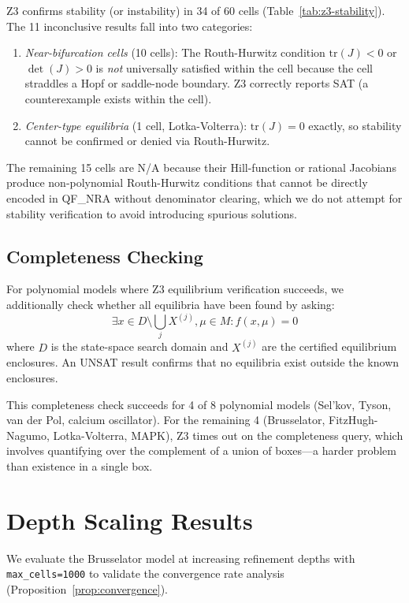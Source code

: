 \documentclass[11pt]{article}
\begin{document}
Z3 confirms stability (or instability) in 34 of 60 cells (Table~\ref{tab:z3-stability}).
The 11 inconclusive results fall into two categories:
\begin{enumerate}
\item \emph{Near-bifurcation cells} (10 cells): The Routh-Hurwitz condition $\mathrm{tr}(J) < 0$ or $\det(J) > 0$ is \emph{not} universally satisfied within the cell because the cell straddles a Hopf or saddle-node boundary.
Z3 correctly reports SAT (a counterexample exists within the cell).

\item \emph{Center-type equilibria} (1 cell, Lotka-Volterra): $\mathrm{tr}(J) = 0$ exactly, so stability cannot be confirmed or denied via Routh-Hurwitz.
\end{enumerate}

The remaining 15 cells are N/A because their Hill-function or rational Jacobians produce non-polynomial Routh-Hurwitz conditions that cannot be directly encoded in QF\_NRA without denominator clearing, which we do not attempt for stability verification to avoid introducing spurious solutions.

\subsection{Completeness Checking}

For polynomial models where Z3 equilibrium verification succeeds, we additionally check whether all equilibria have been found by asking:
\[
\exists x \in D \setminus \bigcup_{j} X^{(j)}, \mu \in M : f(x, \mu) = 0
\]
where $D$ is the state-space search domain and $X^{(j)}$ are the certified equilibrium enclosures.
An UNSAT result confirms that no equilibria exist outside the known enclosures.

This completeness check succeeds for 4 of 8 polynomial models (Sel'kov, Tyson, van der Pol, calcium oscillator).
For the remaining 4 (Brusselator, FitzHugh-Nagumo, Lotka-Volterra, MAPK), Z3 times out on the completeness query, which involves quantifying over the complement of a union of boxes---a harder problem than existence in a single box.

\section{Depth Scaling Results}
\label{app:depth-scaling}

We evaluate the Brusselator model at increasing refinement depths with \texttt{max\_cells=1000} to validate the convergence rate analysis (Proposition~\ref{prop:convergence}).
\end{document}
